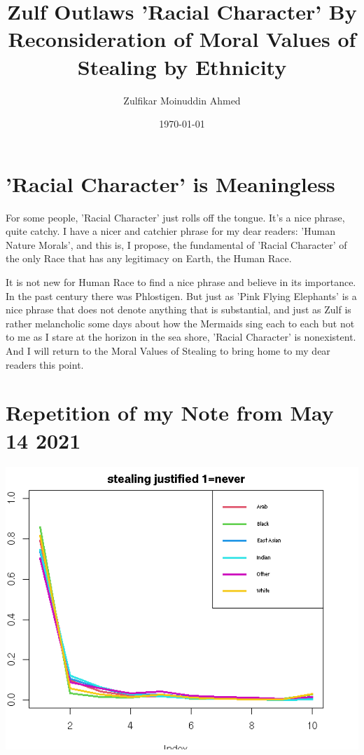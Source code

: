 \documentclass{amsart}
\title{Zulf Outlaws 'Racial Character' By Reconsideration of Moral Values of Stealing by Ethnicity}
\author{Zulfikar Moinuddin Ahmed}
\date{\today}
\begin{document}
\maketitle

\section{'Racial Character' is Meaningless}

For some people, 'Racial Character' just rolls off the tongue.  It's a nice phrase, quite catchy.  I have a nicer and catchier phrase for my dear readers: 'Human Nature Morals', and this is, I propose, the fundamental of 'Racial Character' of the only Race that has any legitimacy on Earth, the Human Race.

It is not new for Human Race to find a nice phrase and believe in its importance.  In the past century there was Phlostigen.  But just as 'Pink Flying Elephants' is a nice phrase that does not denote anything that is substantial, and just as Zulf is rather melancholic some days about how the Mermaids sing each to each but not to me as I stare at the horizon in the sea shore, 'Racial Character' is nonexistent.  And I will return to the Moral Values of Stealing to bring home to my dear readers this point.

\section{Repetition of my Note from May 14 2021}


\includegraphics[scale=0.8]{steal.png}
\end{document}
